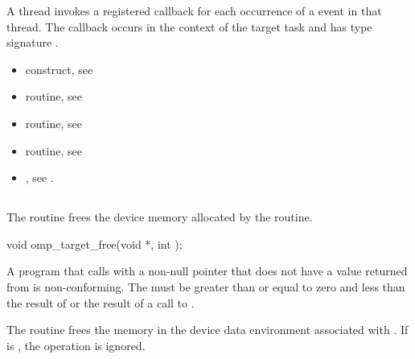 \begin{ccppspecific}
\tools
A thread invokes a registered 
callback for each occurrence of a  event in that thread.
The callback occurs in the context of the target task and has type signature
.

\crossreferences
\begin{itemize}
\item {} construct, see

\item {} routine, see

\item {} routine, see

\item {} routine, see

\item {}, see
.
\end{itemize}



\subsection{}
\label{subsec:omp_target_free}
\summary
The  routine frees the device memory allocated 
by the  routine.

\format
\begin{ompcFunction}
void omp_target_free(void *, int );
\end{ompcFunction}

\constraints

A program that calls  with a non-null pointer
that does not have a value returned from  is
non-conforming.  The  must be greater than or equal to
zero and less than the result of  or the
 result of a call to .

\effect

The  routine frees the memory in the device data
environment associated with .  If  is
, the operation is ignored.


\end{ccppspecific}
